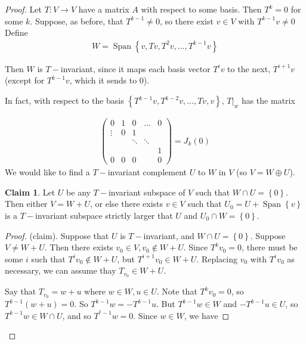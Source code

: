 \documentclass{article}
\theoremstyle{definition} \newtheorem*{definition}{Definition}
\newtheorem*{claim}{Claim}
\DeclareMathOperator{\Span}{Span}
\begin{document}
\begin{proof}
  Let $T:V\rightarrow V$ have a matrix $A$ with respect to some basis.
  Then $T^k = 0$ for some $k$. Suppose, as before, that $T^{k-1}\neq 0$, 
  so there exist $v \in V$ with $T^{k-1}v \neq 0$ Define
  \begin{align*}
    W  = \Span\left\{ v,Tv, T^2v,\dots,T^{k-1}v \right\}
  \end{align*}

  Then $W$ is $T-$invariant, since it maps each basis vector $T^iv$ to 
  the next, $T^{i+1}v$ (except for $T^{k-1}v$, which it sends to 0).

  In fact, with respect to the basis $\left\{ T^{k-1}v,
  T^{k-2}v,\dots,Tv,v\right\}$, $T|_w$ has the matrix 

  \begin{align*}
    \left(
    \begin{matrix}
    0 & 1 & 0 & \dots & 0\\
    \vdots & 0 & 1 &&\\
    &&\ddots&\ddots&\\
    &&&&1\\
    0&0&0&&0
    \end{matrix}
    \right) = J_k(0)
  \end{align*} We would like to find a $T-$invariant complement $U$
  to $W$ in $V$ (so $V=W \oplus U$).

  \begin{claim}
    Let $U$ be any $T-$invariant subspace of $V$ such that 
    $W \cap U=\left\{ 0 \right\}$. Then either $V=W+U$, or else there 
    exists $v \in V$ such that $U_0 = U + \Span\left\{ v \right\}$ is
    a $T-$invariant subspace strictly larger that $U$ and $U_0\cap W
    =\left\{ 0 \right\}$.
  \end{claim}

  \begin{proof}
    (claim). Suppose that $U$ is $T-$invariant, and $W \cap U=\left\{ 0
    \right\}$. Suppose $V \neq W + U$. Then there exists $v_0 \in V,
    v_0 \not\in W+U$. Since $T^kv_0 = 0$, there must be some $i$ such that
    $T^iv_0 \not\in W+U$, but $T^{i+1}v_0 \in W + U$. Replacing 
    $v_0$ with $T^iv_0$ as necessary, we can assume thay $T_{v_0}\in W+
    U$.

    Say that $T_{v_0}=w+u$ where $w \in W,u \in U$. Note that
    $T^kv_0 = 0$, so $T^{k-1}(w+u)=0$. So $T^{k-1}w = -T^{k-1}u$. But
    $T^{k-1}w \in W$ and $-T^{k-1}u \in U$, so $T^{k-1}w \in W \cap U$,
    and so $T^{^k-1}w=0$. Since $w \in W$, we have


\end{proof}
\end{proof}
\end{document}
